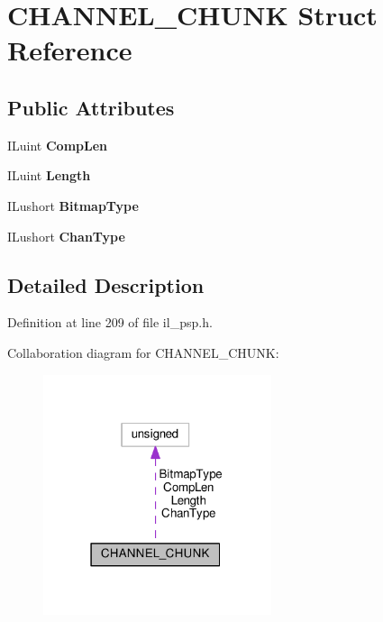 \hypertarget{structCHANNEL__CHUNK}{}\section{C\+H\+A\+N\+N\+E\+L\+\_\+\+C\+H\+U\+NK Struct Reference}
\label{structCHANNEL__CHUNK}
\subsection*{Public Attributes}
\begin{DoxyCompactItemize}
\item 
\mbox{\label{structCHANNEL__CHUNK_aa191f3618281d2e4c2059c6d46fdcd17}} 
I\+Luint {\bfseries Comp\+Len}
\item 
\mbox{\label{structCHANNEL__CHUNK_ab6bad886ca1add2301a537d1ba78d769}} 
I\+Luint {\bfseries Length}
\item 
\mbox{\label{structCHANNEL__CHUNK_a7cacaaa0eef21e264266d7ac8873f67c}} 
I\+Lushort {\bfseries Bitmap\+Type}
\item 
\mbox{\label{structCHANNEL__CHUNK_aa0b8bfd11f4ff9691977f3fce8672750}} 
I\+Lushort {\bfseries Chan\+Type}
\end{DoxyCompactItemize}


\subsection{Detailed Description}


Definition at line 209 of file il\+\_\+psp.\+h.



Collaboration diagram for C\+H\+A\+N\+N\+E\+L\+\_\+\+C\+H\+U\+NK\+:
\nopagebreak
\begin{figure}[H]
\begin{center}
\leavevmode
\includegraphics[width=190pt]{d2/d54/structCHANNEL__CHUNK__coll__graph}
\end{center}
\end{figure}


